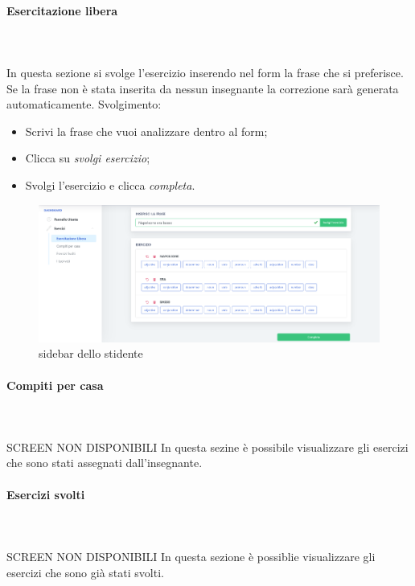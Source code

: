         \paragraph{Esercitazione libera}\mbox{}\\ \\
        In questa sezione si svolge l'esercizio inserendo nel form la frase che 
        si preferisce. Se la frase non è stata inserita da nessun insegnante la 
        correzione sarà generata automaticamente.
        Svolgimento:
        \begin{itemize}
            \item Scrivi la frase che vuoi analizzare dentro al form;
            \item Clicca su \textit{svolgi esercizio};
            \item Svolgi l'esercizio e clicca \textit{completa}.
        \end{itemize}
        \begin{figure}[H]
                \centering
                \includegraphics[width=17cm]{sez/img/studente/EsercitazioneLiberaEsegui.png} 
                \caption{sidebar dello stidente}\label{fig:1}
        \end{figure}
        \paragraph{Compiti per casa}\mbox{}\\ \\
        SCREEN NON DISPONIBILI
        In questa sezine è possibile visualizzare gli esercizi che sono
        stati assegnati dall'insegnante.
        \paragraph{Esercizi svolti}\mbox{}\\ \\
        SCREEN NON DISPONIBILI
        In questa sezione è possiblie visualizzare gli esercizi che sono
        già stati svolti.

